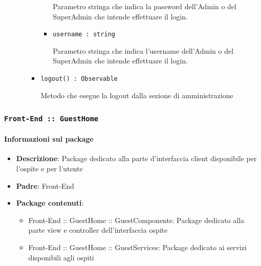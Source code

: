\documentclass[../DefinizioneDiProdotto.tex]{subfiles}
\begin{document}
\begin{itemize}
\begin{itemize}
\begin{itemize}
\begin{itemize}
	 Parametro stringa che indica la password dell'Admin o del SuperAdmin che intende effettuare il login.
	\item \texttt{username : string}\

	 Parametro stringa che indica l'username dell'Admin o del SuperAdmin che intende effettuare il login.
	\end{itemize}
	\end{itemize}\vspace{0.5em}
	\begin{itemize}
	\item \texttt{logout() : Observable}\

	 Metodo che esegue la logout dalla sezione di amministrazione
	\end{itemize}\vspace{0.5em}
	\end{itemize}\end{itemize}

	\subsubsection{ \texttt{Front-End :: GuestHome}}
	\paragraph{Informazioni sul package}\begin{itemize}\item \textbf{Descrizione}: Package dedicato alla parte d'interfaccia client disponibile per l'ospite e per l'utente\item \textbf{Padre}: Front-End\item \textbf{Package contenuti}:
	\begin{itemize}\item Front-End :: GuestHome :: GuestComponents: Package dedicato alla parte view e controller dell'interfaccia ospite
	\item Front-End :: GuestHome :: GuestServices: Package dedicato ai servizi disponibili agli ospiti
	\end{itemize}\end{itemize}

	\newpage
\end{document}
